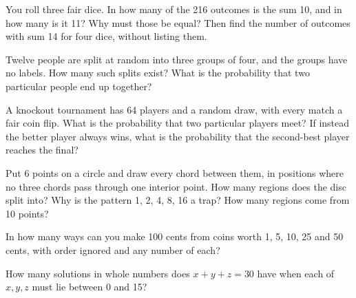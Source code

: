 \begin{question}\label{iq:iv1:counting-and-symmetry:18}
You roll three fair dice. In how many of the 216 outcomes is the sum 10, and in how many is it 11? Why must those be equal? Then find the number of outcomes with sum 14 for four dice, without listing them.
\end{question}

\begin{question}\label{iq:iv1:counting-and-symmetry:19}
Twelve people are split at random into three groups of four, and the groups have no labels. How many such splits exist? What is the probability that two particular people end up together?
\end{question}

\begin{question}\label{iq:iv1:counting-and-symmetry:20}
A knockout tournament has 64 players and a random draw, with every match a fair coin flip. What is the probability that two particular players meet? If instead the better player always wins, what is the probability that the second-best player reaches the final?
\end{question}

\begin{question}\label{iq:iv1:counting-and-symmetry:21}
Put 6 points on a circle and draw every chord between them, in positions where no three chords pass through one interior point. How many regions does the disc split into? Why is the pattern 1, 2, 4, 8, 16 a trap? How many regions come from 10 points?
\end{question}

\begin{question}\label{iq:iv1:counting-and-symmetry:22}
In how many ways can you make 100 cents from coins worth 1, 5, 10, 25 and 50 cents, with order ignored and any number of each?
\end{question}

\begin{question}\label{iq:iv1:counting-and-symmetry:23}
How many solutions in whole numbers does $x + y + z = 30$ have when each of $x, y, z$ must lie between 0 and 15?
\end{question}

